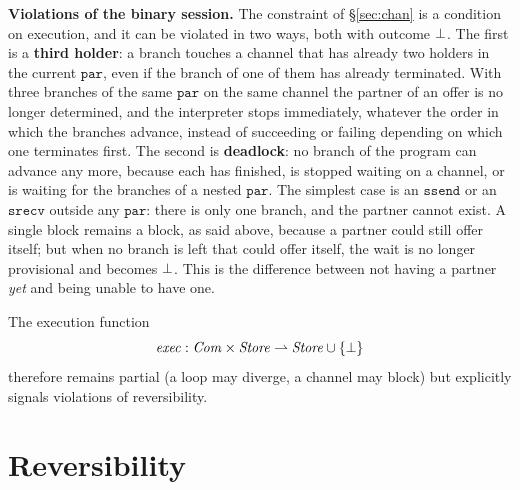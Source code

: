 \medskip
\noindent
\textbf{Violations of the binary session.} The constraint of \S\ref{sec:chan} is
a condition on execution, and it can be violated in two ways, both with outcome
$\bot$. The first is a \textbf{third holder}: a branch touches a channel that has
already two holders in the current $\mathtt{par}$, even if the branch of one of
them has already terminated. With three branches of the same $\mathtt{par}$ on the
same channel the partner of an offer is no longer determined, and the interpreter
stops immediately, whatever the order in which the branches advance, instead of
succeeding or failing depending on which one terminates first.
The second is \textbf{deadlock}: no branch of the program can advance any more,
because each has finished, is stopped waiting on a channel, or is waiting for the branches of a
nested $\mathtt{par}$. The simplest case is an $\mathtt{ssend}$ or an
$\mathtt{srecv}$ outside any $\mathtt{par}$: there is only one branch, and the partner
cannot exist. A single block remains a block, as said above, because a
partner could still offer itself; but when no branch is left that could
offer itself, the wait is no longer provisional and becomes $\bot$. This is the difference between
not having a partner \emph{yet} and being unable to have one.

\medskip
\noindent
The execution function
\[
\mathit{exec} : \mathit{Com} \times \mathit{Store} \rightharpoonup \mathit{Store} \cup \{\bot\}
\]
therefore remains partial (a loop may diverge, a channel may block) but
explicitly signals violations of reversibility.

\chapter{Reversibility}
\label{chap:reversibilita}
\label{sec:rev}

